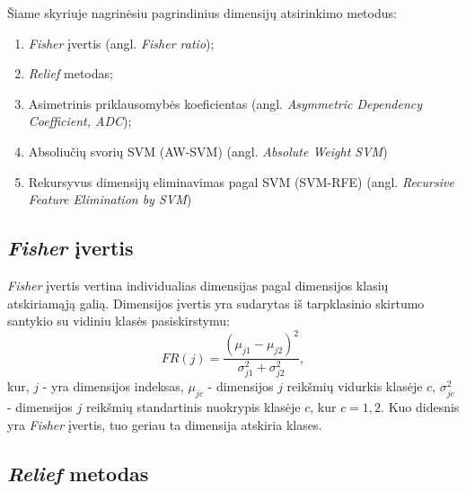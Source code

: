 Šiame skyriuje nagrinėsiu pagrindinius dimensijų atsirinkimo metodus:
\begin{enumerate}
 \item \textit{Fisher} įvertis (angl. \textit{Fisher ratio})\cite{Pavlidis:2001:GFC:369133.369228};
 \item \textit{Relief} metodas\cite{DBLP:journals/ml/Robnik-SikonjaK03};
 \item Asimetrinis priklausomybės koeficientas\cite{Shannon:2001:MTC:584091.584093} (angl. \textit{Asymmetric Dependency Coefficient, ADC});
 \item Absoliučių svorių SVM\cite{vapnik2000nature} (AW-SVM) (angl. \textit{Absolute Weight SVM})
 \item Rekursyvus dimensijų eliminavimas pagal SVM\cite{Guyon:2002:GSC:599613.599671} (SVM-RFE) (angl. \textit{Recursive Feature Elimination by SVM})
\end{enumerate}

\subsection{\textit{Fisher} įvertis}

\textit{Fisher} įvertis vertina individualias dimensijas pagal dimensijos klasių atskiriamąją galią. Dimensijos įvertis yra sudarytas iš tarpklasinio skirtumo santykio su vidiniu klasės pasiskirstymu:
\begin{equation}
 FR(j) = \frac{(\mu_{j1} - \mu_{j2})^2}{\sigma_{j1}^2 + \sigma_{j2}^2},
\end{equation}
kur, 
$j$ - yra dimensijos indeksas, 
$\mu_{jc}$ - dimensijos $j$ reikšmių vidurkis klasėje $c$, 
$\sigma_{jc}^2$ - dimensijos $j$ reikšmių standartinis nuokrypis klasėje $c$, kur $c={1,2}$. Kuo didesnis yra \textit{Fisher} įvertis, tuo geriau ta dimensija atskiria klases.

\subsection{\textit{Relief} metodas}

